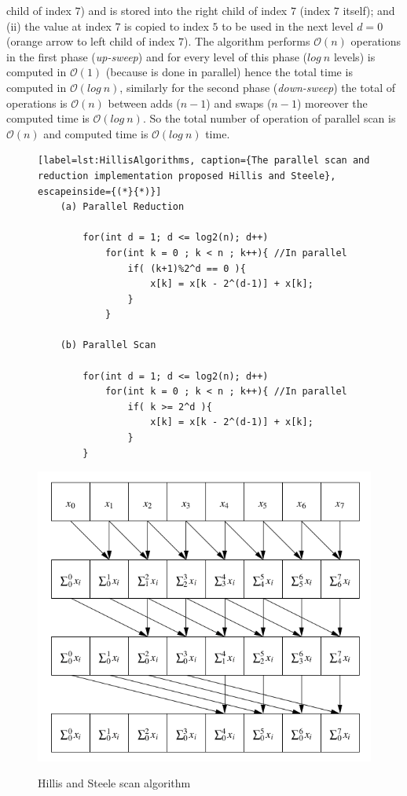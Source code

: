 \documentclass[Ingles]{ic-tese-v1}
\begin{document}
child of index  $7$) and is stored  into the right child  of index $7$
(index $7$ itself); and (ii) the value at index $7$ is copied to index
$5$ to be used  in the next level $d = 0$ (orange  arrow to left child
of index $7$). The algorithm  performs $\mathcal{O}(n)$ operations in the first
phase (\textit{up-sweep}) and for every level of this phase ($log\ n $ levels) is computed in $\mathcal{O}(1)$ (because is done in parallel) hence the total time is computed in $\mathcal{O}(log\ n)$, similarly for the second phase (\textit{down-sweep}) the total of operations is $\mathcal{O}(n)$ between adds ($n-1$) and swaps ($n-1$) moreover the computed time is $\mathcal{O}(log\ n)$. So the total number of operation of parallel scan is $\mathcal{O}(n)$ and computed time is $\mathcal{O}(log\ n)$ time.\\
 

\begin{figure}[t]
	\lstset{basicstyle=\scriptsize}
	\begin{lstlisting}[label=lst:HillisAlgorithms, caption={The parallel scan and reduction implementation proposed Hillis and Steele}, escapeinside={(*}{*)}]
	(a) Parallel Reduction

		for(int d = 1; d <= log2(n); d++)
			for(int k = 0 ; k < n ; k++){ //In parallel
				if( (k+1)%2^d == 0 ){
					x[k] = x[k - 2^(d-1)] + x[k];
				}
			}

	(b) Parallel Scan

		for(int d = 1; d <= log2(n); d++)
			for(int k = 0 ; k < n ; k++){ //In parallel
				if( k >= 2^d ){
					x[k] = x[k - 2^(d-1)] + x[k];
				}
		}

	\end{lstlisting}
\end{figure}

\begin{figure}[t]
	\centering
	\caption{Hillis and  Steele scan algorithm}
	\includegraphics[scale=0.5]{images/hillisscan.png}
	\label{fig:scanhillis}

\end{figure}
\end{document}
